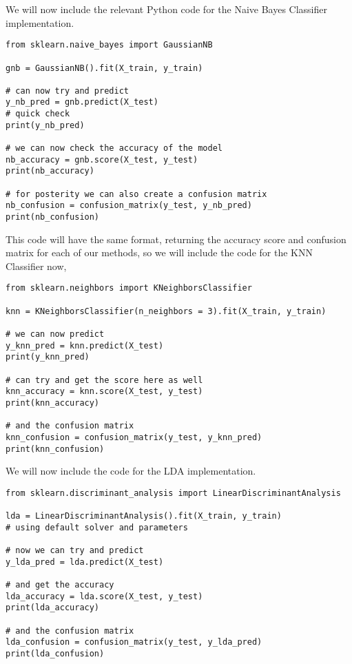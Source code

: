 \documentclass[12pt, letterpaper]{article}
\begin{document}
We will now include the relevant Python code for the Naive Bayes Classifier implementation. 

\begin{verbatim}
from sklearn.naive_bayes import GaussianNB 

gnb = GaussianNB().fit(X_train, y_train) 

# can now try and predict 
y_nb_pred = gnb.predict(X_test)
# quick check 
print(y_nb_pred)

# we can now check the accuracy of the model 
nb_accuracy = gnb.score(X_test, y_test) 
print(nb_accuracy)

# for posterity we can also create a confusion matrix 
nb_confusion = confusion_matrix(y_test, y_nb_pred)
print(nb_confusion) 
\end{verbatim}

This code will have the same format, returning the accuracy score and confusion matrix for each of our methods, so we will include the code for the KNN Classifier now, 

\begin{verbatim} 
from sklearn.neighbors import KNeighborsClassifier 

knn = KNeighborsClassifier(n_neighbors = 3).fit(X_train, y_train) 

# we can now predict 
y_knn_pred = knn.predict(X_test) 
print(y_knn_pred) 

# can try and get the score here as well 
knn_accuracy = knn.score(X_test, y_test)
print(knn_accuracy) 

# and the confusion matrix 
knn_confusion = confusion_matrix(y_test, y_knn_pred) 
print(knn_confusion) 
\end{verbatim}

We will now include the code for the LDA implementation.

\begin{verbatim}
from sklearn.discriminant_analysis import LinearDiscriminantAnalysis 

lda = LinearDiscriminantAnalysis().fit(X_train, y_train)
# using default solver and parameters 

# now we can try and predict 
y_lda_pred = lda.predict(X_test) 

# and get the accuracy 
lda_accuracy = lda.score(X_test, y_test)
print(lda_accuracy)

# and the confusion matrix 
lda_confusion = confusion_matrix(y_test, y_lda_pred) 
print(lda_confusion)
\end{verbatim}
\end{document}
